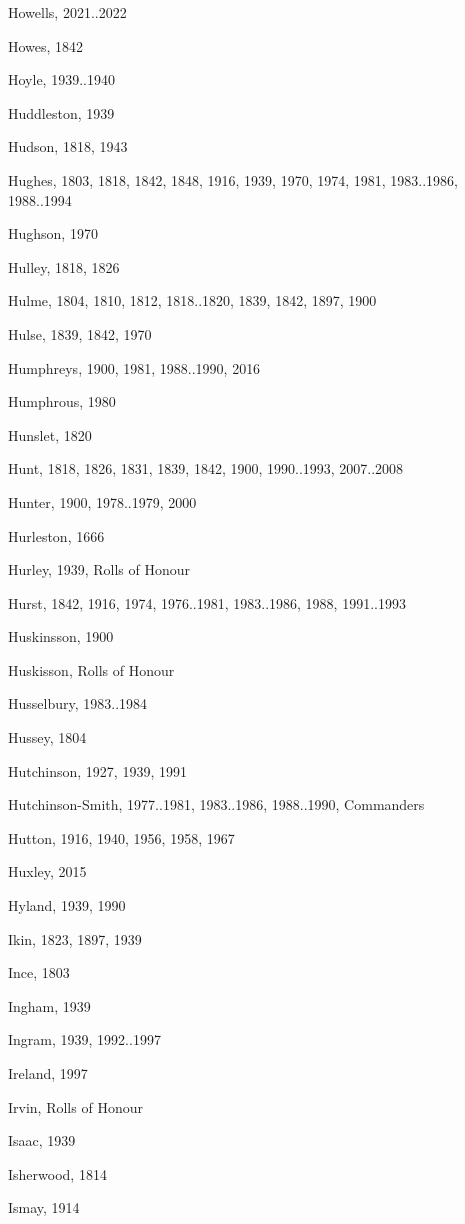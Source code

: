\begin{theindex}
\item Howells, 2021..2022
\item Howes, 1842
\item Hoyle, 1939..1940
\item Huddleston, 1939
\item Hudson, 1818, 1943
\item Hughes, 1803, 1818, 1842, 1848, 1916, 1939, 1970, 1974, 1981, 1983..1986, 1988..1994
\item Hughson, 1970
\item Hulley, 1818, 1826
\item Hulme, 1804, 1810, 1812, 1818..1820, 1839, 1842, 1897, 1900
\item Hulse, 1839, 1842, 1970
\item Humphreys, 1900, 1981, 1988..1990, 2016
\item Humphrous, 1980
\item Hunslet, 1820
\item Hunt, 1818, 1826, 1831, 1839, 1842, 1900, 1990..1993, 2007..2008
\item Hunter, 1900, 1978..1979, 2000
\item Hurleston, 1666
\item Hurley, 1939, Rolls of Honour
\item Hurst, 1842, 1916, 1974, 1976..1981, 1983..1986, 1988, 1991..1993
\item Huskinsson, 1900
\item Huskisson, Rolls of Honour
\item Husselbury, 1983..1984
\item Hussey, 1804
\item Hutchinson, 1927, 1939, 1991
\item Hutchinson-Smith, 1977..1981, 1983..1986, 1988..1990, Commanders
\item Hutton, 1916, 1940, 1956, 1958, 1967
\item Huxley, 2015
\item Hyland, 1939, 1990
\item Ikin, 1823, 1897, 1939
\item Ince, 1803
\item Ingham, 1939
\item Ingram, 1939, 1992..1997
\item Ireland, 1997
\item Irvin, Rolls of Honour
\item Isaac, 1939
\item Isherwood, 1814
\item Ismay, 1914

\end{theindex}
